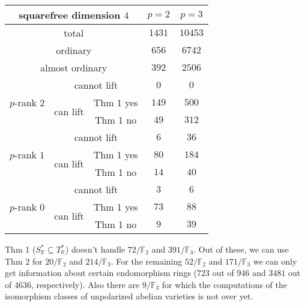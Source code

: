 \documentclass[usenames,dvipsnames,handout]{beamer}
\def\R{\mathbb{R}}
\def\F{\mathbb{F}}
\begin{document}
\begin{frame}[noframenumbering]{}{}
\begin{table}[ht]
    \centering
\footnotesize	
    \begin{tabular}{|c|c|c|c|c|}\hline
\multicolumn{3}{|c|}{squarefree dimension $4$}                  & $p=2$ & $p=3$ \\\hline
\multicolumn{3}{|c|}{total}                                     & $1431$ & $10453$  \\\hline                    
\multicolumn{3}{|c|}{ordinary}                                  & $656$ & $6742$  \\\hline
\multicolumn{3}{|c|}{almost ordinary}                           & $392$ & $2506$  \\\hline
\multirow{3}{*}{$p$-rank $2$} & \multicolumn{2}{|c|}{cannot lift}    & $0$ & $0$ \\\cline{2-5}
                              & \multirow{2}{*}{can lift} & Thm 1 yes & $149$ & $500$   \\\cline{3-5}
                              &                          & Thm 1 no  & $49$ & $312$   \\\hline
\multirow{3}{*}{$p$-rank $1$} & \multicolumn{2}{|c|}{cannot lift}    & $6$ & $36$ \\\cline{2-5}
                              & \multirow{2}{*}{can lift} & Thm 1 yes & $80$ & $184$   \\\cline{3-5}
                              &                          & Thm 1 no  & $14$ & $40$   \\\hline
\multirow{3}{*}{$p$-rank $0$} & \multicolumn{2}{|c|}{cannot lift}    & $3$ & $6$   \\\cline{2-5}
                              & \multirow{2}{*}{can lift} & Thm 1 yes & $73$ & $88$ \\\cline{3-5}
                              &                          & Thm 1 no  & $9$ & $39$ \\\hline                              
    \end{tabular}
    \label{tab:dim4}
\end{table}
{\small
	Thm 1 ($S^*_\R\subseteq T^*_\R$) doesn't handle $72/\F_2$ and $391/\F_3$.
	Out of these, we can use Thm 2 for $20/\F_2$ and $214/\F_3$.
	For the remaining $52/\F_2$ and $171/\F_3$ we can only get information about certain endomorphism rings ($723$ out of $946$ and $3481$ out of $4636$, respectively).
	Also there are $9/\F_3$ for which the computations of the isomorphism classes of unpolarized abelian varieties is not over yet.
}
\end{frame}
\end{document}
